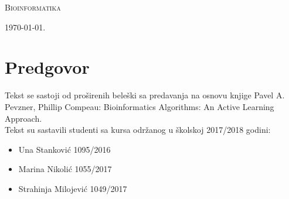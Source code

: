 \documentclass[a4paper]{book}
\begin{document}
\begin{titlepage}
	\vspace*{0.4\textheight}
	
	\begin{center}
		{\Huge \textsc{Bioinformatika}}
	\end{center}
	
	\vfill
	
	\begin{center}
		{\Large \today.}
	\end{center}
\end{titlepage}

\blankpage

\frontmatter
\tableofcontents
\blankpage

\chapter*{Predgovor}
Tekst se sastoji od proširenih beleški sa predavanja na osnovu knjige Pavel A. Pevzner, Phillip Compeau: Bioinformatics Algorithms: An Active Learning Approach. \\Tekst su sastavili studenti sa kursa održanog u školskoj 2017/2018 godini: 
\begin{itemize}
	\item Una Stanković 1095/2016
	\item Marina Nikolić 1055/2017
	\item Strahinja Milojević 1049/2017
\end{itemize}


\blankpage

\mainmatter



\backmatter
\renewcommand{\bibname}{Literatura}

\begingroup
\raggedright

\endgroup


\end{document}
